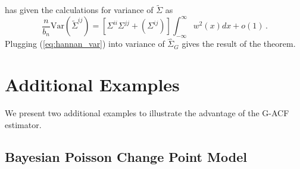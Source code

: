 \documentclass[12pt]{article}
\newcommand{\Var}{\text{Var}}
\theoremstyle{remark}
\begin{document}
\cite{hannan:1970} has given the calculations for variance of $\tilde{\Sigma}$ as 
\begin{equation} \label{eq:hannan_var}
\dfrac{n}{b_n}\Var(\tilde{\Sigma}^{ij}) = \left[\Sigma^{ii}\Sigma^{jj} + \left(\Sigma^{ij} \right) \right]\int_{-\infty}^{\infty}w^2(x)dx + o(1)\,.
\end{equation}
Plugging (\ref{eq:hannan_var}) into variance of $\hat{\Sigma}_{G}$ gives the result of the theorem.
 

\section{Additional Examples}
We present two additional examples to illustrate the advantage of the G-ACF estimator. 
\subsection{Bayesian Poisson Change Point Model}

\end{document}
